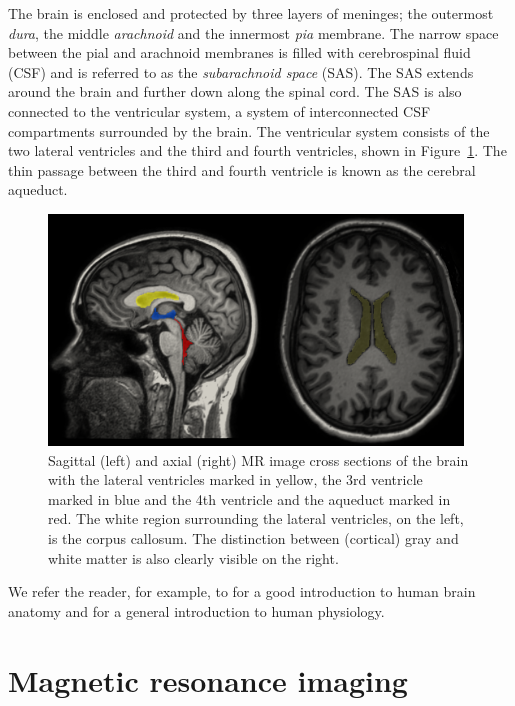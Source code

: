   The
brain is enclosed and protected by three layers of meninges; the
outermost \emph{dura}, the middle \emph{arachnoid} and the innermost
\emph{pia} membrane. The narrow space between the pial and arachnoid
membranes is filled with cerebrospinal fluid (CSF) and is referred to
as the \emph{subarachnoid space} (SAS). The SAS extends around the
brain and further down along the spinal cord. The SAS is also
connected to the ventricular system, a system of interconnected CSF
compartments surrounded by the brain. The ventricular system consists
of the two lateral ventricles and the third and fourth ventricles,
shown in Figure~\ref{fig:chp2:ventricles}. The thin passage between
the third and fourth ventricle is known as the cerebral aqueduct.
\begin{figure}
  \centering
  \includegraphics[width=0.98\textwidth]{./graphics/chp2/exp-vent.png}
  \caption{Sagittal (left) and axial (right) MR image cross sections
    of the brain with the lateral ventricles marked in yellow, the 3rd
    ventricle marked in blue and the 4th ventricle and the aqueduct
    marked in red. The white region surrounding the lateral
    ventricles, on the left, is the corpus callosum. The distinction
    between (cortical) gray and white matter is also clearly visible
    on the right.}
  \label{fig:chp2:ventricles}
\end{figure}

We refer the reader, for example, to \cite{gray2009gray} for a good
introduction to human brain anatomy and \cite{boron2016medical} for a
general introduction to human physiology.

\section{Magnetic resonance imaging}

